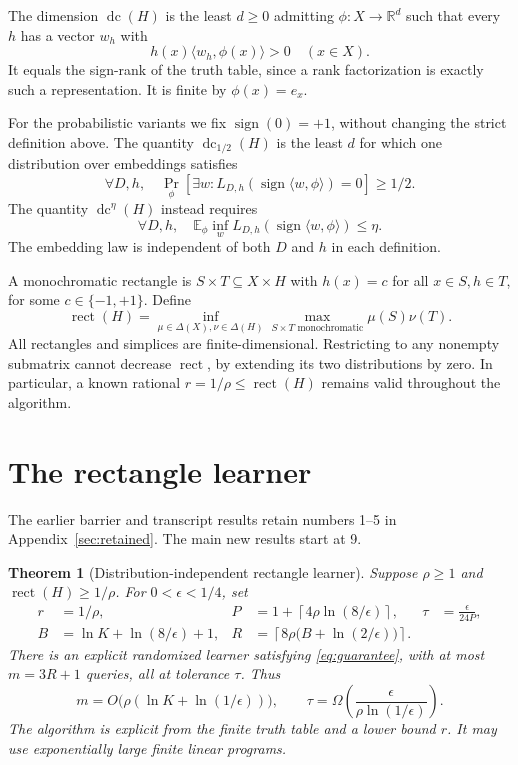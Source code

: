 \documentclass[11pt]{article}
\newtheorem{theorem}{Theorem}
\DeclareMathOperator{\dc}{dc}
\DeclareMathOperator{\sign}{sign}
\DeclareMathOperator{\rect}{rect}
\newcommand{\R}{\mathbb R}
\newcommand{\E}{\mathbb E}
\newcommand{\1}{\mathbf 1}
\begin{document}
The dimension $\dc(H)$ is the least $d\ge0$ admitting $\phi:X\to\R^d$ such that every $h$ has a vector $w_h$ with
\begin{equation}\label{eq:strict}
 h(x)\langle w_h,\phi(x)\rangle>0\quad(x\in X).
\end{equation}
It equals the sign-rank of the truth table, since a rank factorization is exactly such a representation. It is finite by $\phi(x)=e_x$.

For the probabilistic variants we fix $\sign(0)=+1$, without changing the strict definition above. The quantity $\dc_{1/2}(H)$ is the least $d$ for which one distribution over embeddings satisfies
\[
 \forall D,h,\quad \Pr_\phi[\exists w:L_{D,h}(\sign\langle w,\phi\rangle)=0]\ge1/2.
\]
The quantity $\dc^\eta(H)$ instead requires
\[
 \forall D,h,\quad \E_\phi\inf_w L_{D,h}(\sign\langle w,\phi\rangle)\le\eta.
\]
The embedding law is independent of both $D$ and $h$ in each definition.

A monochromatic rectangle is $S\times T\subseteq X\times H$ with $h(x)=c$ for all $x\in S,h\in T$, for some $c\in\{-1,+1\}$. Define
\[
 \rect(H)=\inf_{\mu\in\Delta(X),\nu\in\Delta(H)}
       \max_{S\times T\text{ monochromatic}}\mu(S)\nu(T).
\]
All rectangles and simplices are finite-dimensional. Restricting to any nonempty submatrix cannot decrease $\rect$, by extending its two distributions by zero. In particular, a known rational $r=1/\rho\le\rect(H)$ remains valid throughout the algorithm.

\section{The rectangle learner}
The earlier barrier and transcript results retain numbers 1--5 in Appendix~\ref{sec:retained}. The main new results start at 9.
\setcounter{theorem}{8}
\begin{theorem}[Distribution-independent rectangle learner]\label{thm:main}
Suppose $\rho\ge1$ and $\rect(H)\ge1/\rho$. For $0<\epsilon<1/4$, set
\begin{align}
 r&=1/\rho,& P&=1+\left\lceil4\rho\ln(8/\epsilon)\right\rceil,
 &\tau&=\frac{\epsilon}{24P},\label{eq:params1}\\
 B&=\ln K+\ln(8/\epsilon)+1,
 &R&=\left\lceil8\rho\bigl(B+\ln(2/\epsilon)\bigr)\right\rceil.
 \label{eq:params2}
\end{align}
There is an explicit randomized learner satisfying \eqref{eq:guarantee}, with at most $m=3R+1$ queries, all at tolerance $\tau$. Thus
\[
 m=O\bigl(\rho(\ln K+\ln(1/\epsilon))\bigr),\qquad
 \tau=\Omega\left(\frac{\epsilon}{\rho\ln(1/\epsilon)}\right).
\]
The algorithm is explicit from the finite truth table and a lower bound $r$. It may use exponentially large finite linear programs.
\end{theorem}
\end{document}
